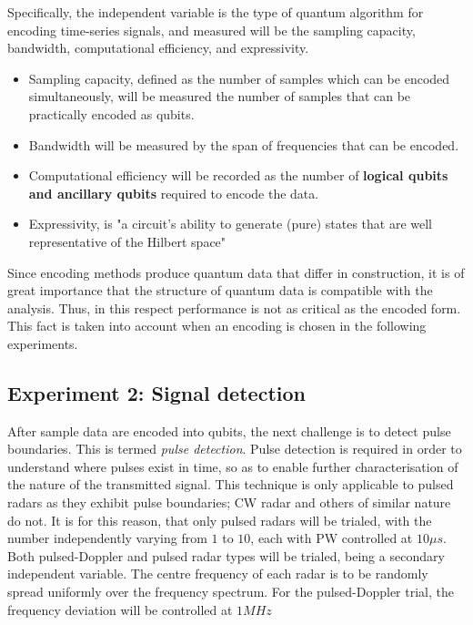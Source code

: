 Specifically, the independent variable is the type of quantum algorithm for encoding time-series signals, and measured will be the sampling capacity, bandwidth, computational efficiency, and expressivity.
\begin{itemize}
    \item Sampling capacity, defined as the number of samples which can be encoded simultaneously, will be measured the number of samples that can be practically encoded as qubits.
    \item Bandwidth will be measured by the span of frequencies that can be encoded.
    \item Computational efficiency will be recorded as the number of \textbf{logical qubits and ancillary qubits} required to encode the data.
    \item Expressivity, is "a circuit’s ability to generate (pure) states that are well representative of the Hilbert space" \cite{sim_expressibility_2019} 
\end{itemize}
Since encoding methods produce quantum data that differ in construction, it is of great importance that the structure of quantum data is compatible with the analysis.
Thus, in this respect performance is not as critical as the encoded form.
This fact is taken into account when an encoding is chosen in the following experiments.


\subsection{Experiment 2: Signal detection}

After sample data are encoded into qubits, the next challenge is to detect pulse boundaries. This is termed \textit{pulse detection}.
Pulse detection is required in order to understand where pulses exist in time, so as to enable further characterisation of the nature of the transmitted signal.
This technique is only applicable to pulsed radars as they exhibit pulse boundaries; \ac{CW} radar and others of similar nature do not.
It is for this reason, that only pulsed radars will be trialed, with the number independently varying from \(1\) to \(10\), each with \ac{PW} controlled at \(10 \mu s\).
Both pulsed-Doppler and pulsed radar types will be trialed, being a secondary independent variable.
The centre frequency of each radar is to be randomly spread uniformly over the frequency spectrum.
For the pulsed-Doppler trial, the frequency deviation will be controlled at \(1MHz\)

